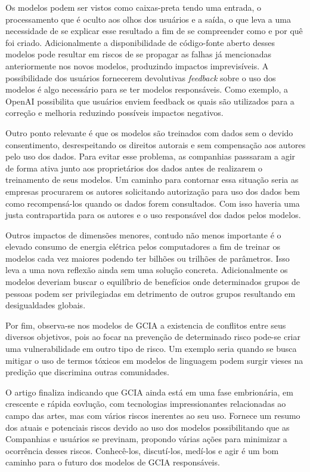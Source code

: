 Os modelos podem ser vistos como caixas-preta tendo uma entrada, o processamento que é oculto aos olhos dos usuários 
e a saída, o que leva a uma necessidade de se explicar esse resultado a fim de se compreender como e por quê foi criado.
Adicionalmente a disponibilidade de código-fonte aberto desses modelos pode resultar em riscos de se propagar as falhas 
já mencionadas anteriormente nos novos modelos, produzindo impactos imprevisíveis. 
A possibilidade dos usuários fornecerem devolutivas \textit{feedback} sobre o uso dos modelos é algo necessário
para se ter modelos responsáveis. Como exemplo, a OpenAI possibilita que usuários enviem feedback
os quais são utilizados para a correção e melhoria reduzindo possíveis impactos negativos.

Outro ponto relevante é que os modelos são treinados com dados sem o devido consentimento, desrespeitando os direitos
autorais e sem compensação aos autores pelo uso dos dados. Para evitar esse problema, as companhias passsaram 
a agir de forma ativa junto aos proprietários dos dados antes de realizarem o treinamento de seus modelos. 
Um caminho para contornar essa situação seria as empresas procurarem os autores solicitando autorização 
para uso dos dados bem como recompensá-los quando os dados forem consultados. Com isso haveria uma justa contrapartida 
para os autores e o uso responsável dos dados pelos modelos.

Outros impactos de dimensões menores, contudo não menos importante é o elevado consumo de energia elétrica pelos computadores a fim de treinar os modelos 
cada vez maiores podendo ter bilhões ou trilhões de parâmetros. Isso leva a uma nova reflexão ainda sem uma solução 
concreta. Adicionalmente os modelos deveriam buscar o equilíbrio de benefícios onde determinados grupos de 
pessoas podem ser privilegiadas em detrimento de outros grupos resultando em desigualdades globais.

Por fim, observa-se nos modelos de GCIA a existencia de conflitos entre seus diversos objetivos, pois ao focar na prevenção 
de determinado risco pode-se criar uma vulnerabilidade em outro tipo de risco. Um exemplo seria quando se busca mitigar 
o uso de termos tóxicos em modelos de linguagem podem surgir vieses na predição que discrimina outras 
comunidades.

O artigo finaliza indicando que GCIA ainda está em uma fase embrionária, em crescente e rápida eovlução, 
com tecnologias impressionantes relacionadas ao campo das artes, mas com vários riscos inerentes ao seu uso. 
Fornece um resumo dos atuais e potenciais riscos devido ao uso dos modelos possibilitando que as Companhias
e usuários se previnam, propondo várias ações para minimizar a ocorrência desses riscos.
Conhecê-los, discutí-los, medí-los e agir é um bom caminho para o futuro dos modelos de GCIA responsáveis.
